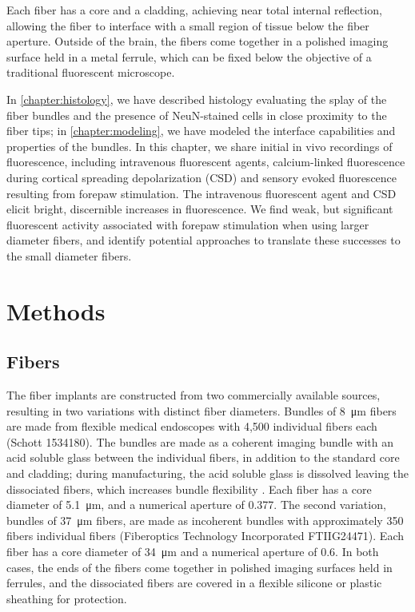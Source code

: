Each fiber has a core and a cladding, achieving near total internal 
reflection, allowing the fiber to interface with a small region of 
tissue below the fiber aperture. Outside of the brain, the fibers come
 together in a polished imaging surface held in a metal ferrule, which
 can be fixed below the objective of a traditional fluorescent 
microscope.



In \cref{chapter:histology}, we have described histology evaluating 
the splay of the 
fiber bundles and the presence of NeuN-stained cells in close 
proximity to the fiber tips; in 
\cref{chapter:modeling}, we have modeled 
the interface capabilities and properties of the bundles. 
In this chapter, we share initial in vivo recordings of fluorescence, 
including intravenous fluorescent agents, calcium-linked fluorescence 
during cortical spreading depolarization (CSD) and sensory evoked 
fluorescence resulting from forepaw stimulation. The intravenous 
fluorescent agent and CSD elicit bright, discernible increases in 
fluorescence. We find weak, but significant fluorescent activity 
associated with forepaw stimulation when using larger diameter 
fibers, and identify potential approaches to translate these successes 
to the small diameter fibers.

\section{Methods}

\subsection{Fibers}

The fiber implants are constructed from two commercially available 
sources, resulting in two variations with distinct fiber diameters. 
Bundles of 8~\si{\micro\meter} fibers are made from flexible medical 
endoscopes with 4,500 individual fibers each (Schott 1534180). The 
bundles are made as a coherent imaging bundle with an acid soluble 
glass between the individual fibers, in addition to the standard core 
and cladding; during manufacturing, the acid soluble glass is 
dissolved leaving the dissociated fibers, which increases bundle 
flexibility \cite{Gerstner:2004to}. Each fiber has a core diameter of 
5.1~\si{\micro\meter}, and a numerical aperture of 0.377. The second 
variation, bundles of 37~\si{\micro\meter} fibers, are made as 
incoherent bundles with approximately 350 fibers individual fibers 
(Fiberoptics Technology Incorporated FTIIG24471). Each fiber has a 
core diameter of 34~\si{\micro\meter} and a numerical aperture of 0.6.
 In both cases, the ends of the fibers come together in polished 
imaging surfaces held in ferrules, and the dissociated fibers are 
covered in a flexible silicone or plastic sheathing for protection.



